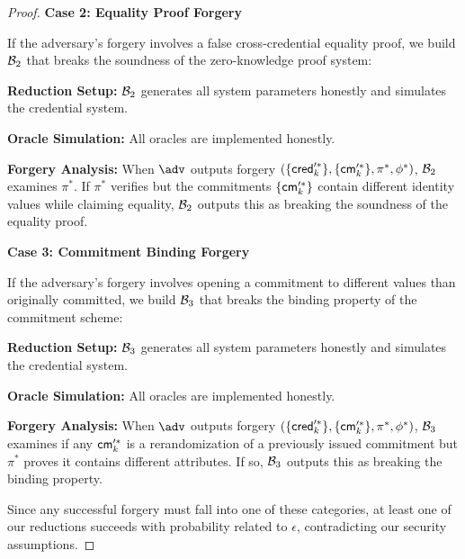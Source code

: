 \begin{proof}
\noindent \textbf{Case 2: Equality Proof Forgery}

\noindent If the adversary's forgery involves a false cross-credential equality proof, we build $\mathcal{B}_2$ that breaks the soundness of the zero-knowledge proof system:

\noindent \textbf{Reduction Setup:} $\mathcal{B}_2$ generates all system parameters honestly and simulates the credential system.

\noindent \textbf{Oracle Simulation:} All oracles are implemented honestly.

\noindent \textbf{Forgery Analysis:} When $\adv$ outputs forgery $(\{\mathsf{cred}_k'^*\}, \{\mathsf{cm}_k'^*\}, \pi^*, \phi^*)$, $\mathcal{B}_2$ examines $\pi^*$. If $\pi^*$ verifies but the commitments $\{\mathsf{cm}_k'^*\}$ contain different identity values while claiming equality, $\mathcal{B}_2$ outputs this as breaking the soundness of the equality proof.

\noindent \textbf{Case 3: Commitment Binding Forgery}

\noindent If the adversary's forgery involves opening a commitment to different values than originally committed, we build $\mathcal{B}_3$ that breaks the binding property of the commitment scheme:

\noindent \textbf{Reduction Setup:} $\mathcal{B}_3$ generates all system parameters honestly and simulates the credential system.

\noindent \textbf{Oracle Simulation:} All oracles are implemented honestly.

\noindent \textbf{Forgery Analysis:} When $\adv$ outputs forgery $(\{\mathsf{cred}_k'^*\}, \{\mathsf{cm}_k'^*\}, \pi^*, \phi^*)$, $\mathcal{B}_3$ examines if any $\mathsf{cm}_k'^*$ is a rerandomization of a previously issued commitment but $\pi^*$ proves it contains different attributes. If so, $\mathcal{B}_3$ outputs this as breaking the binding property.

\vspace{1em}
Since any successful forgery must fall into one of these categories, at least one of our reductions succeeds with probability related to $\epsilon$, contradicting our security assumptions.
\end{proof}





























